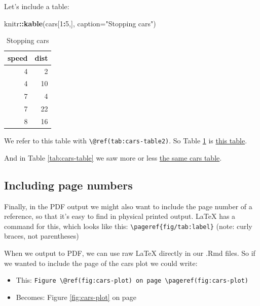 \documentclass[a4paper, nobind]{templates/ociamthesis}
\providecommand{\tightlist}{%
  \setlength{\itemsep}{0pt}\setlength{\parskip}{0pt}}
\newenvironment{Shaded}{\begin{snugshade}}{\end{snugshade}}
\newcommand{\AttributeTok}[1]{\textcolor[rgb]{0.13,0.29,0.53}{#1}}
\newcommand{\DecValTok}[1]{\textcolor[rgb]{0.00,0.00,0.81}{#1}}
\newcommand{\FunctionTok}[1]{\textcolor[rgb]{0.13,0.29,0.53}{\textbf{#1}}}
\newcommand{\NormalTok}[1]{#1}
\newcommand{\SpecialCharTok}[1]{\textcolor[rgb]{0.81,0.36,0.00}{\textbf{#1}}}
\newcommand{\StringTok}[1]{\textcolor[rgb]{0.31,0.60,0.02}{#1}}
\renewenvironment{Shaded}
{
  \vspace{10pt}%
  \begin{snugshade}%
}{%
  \end{snugshade}%
  \vspace{8pt}%
}
\begin{document}
Let's include a table:

\begin{Shaded}
\begin{Highlighting}[]
\NormalTok{knitr}\SpecialCharTok{::}\FunctionTok{kable}\NormalTok{(cars[}\DecValTok{1}\SpecialCharTok{:}\DecValTok{5}\NormalTok{,],}
            \AttributeTok{caption=}\StringTok{"Stopping cars"}\NormalTok{)}
\end{Highlighting}
\end{Shaded}

\begin{table}

\caption{\label{tab:cars-table2}Stopping cars}
\centering
\begin{tabular}[t]{r|r}
\hline
speed & dist\\
\hline
4 & 2\\
\hline
4 & 10\\
\hline
7 & 4\\
\hline
7 & 22\\
\hline
8 & 16\\
\hline
\end{tabular}
\end{table}

We refer to this table with \texttt{\textbackslash{}@ref(tab:cars-table2)}.
So Table \ref{tab:cars-table2} is \hyperref[tab:cars-table2]{this table}.

And in Table \ref{tab:cars-table} we saw more or less \hyperref[tab:cars-table]{the same cars table}.

\subsection{Including page numbers}\label{including-page-numbers}

Finally, in the PDF output we might also want to include the page number of a reference, so that it's easy to find in physical printed output.
LaTeX has a command for this, which looks like this: \texttt{\textbackslash{}pageref\{fig/tab:label\}} (note: curly braces, not parentheses)

When we output to PDF, we can use raw LaTeX directly in our .Rmd files. So if we wanted to include the page of the cars plot we could write:

\begin{itemize}
\tightlist
\item
  This: \texttt{Figure\ \textbackslash{}@ref(fig:cars-plot)\ on\ page\ \textbackslash{}pageref(fig:cars-plot)}
\item
  Becomes: Figure \ref{fig:cars-plot} on page \pageref{fig:cars-plot}
\end{itemize}
\end{document}
